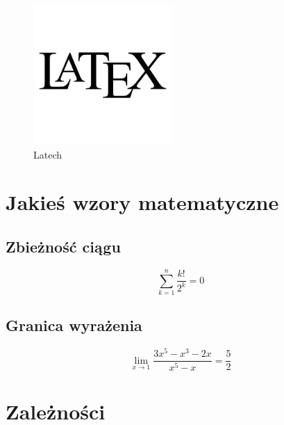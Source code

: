 \documentclass{article}
\begin{document}
\begin{figure}[h]
\caption{Latech}
\begin{center}
\includegraphics[width=150pt]{latex.png}
\end{center}
\end{figure}

\section{Jakieś wzory matematyczne}
\subsection{Zbieżność ciągu}
\small{
$$
\sum_{k=1}^n \frac{k!}{2^k}
= 0
$$}
\subsection{Granica wyrażenia}
$$
\lim_{x \to 1}
\frac{3x^5-x^3-2x}{x^5-x}=
\frac{5}{2}
$$

\section{Zależności}
\end{document}
